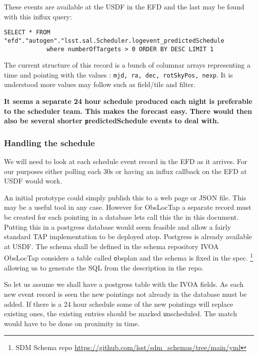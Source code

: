 These events are available at the USDF in the EFD and the last may be found with this influx query:
\begin{lstlisting}
SELECT * FROM "efd"."autogen"."lsst.sal.Scheduler.logevent_predictedSchedule
            where numberOfTargets > 0 ORDER BY DESC LIMIT 1
\end{lstlisting}

The current structure of this record is a bunch of columnar arrays representing a time and pointing with the
values : {\tt mjd, ra, dec, rotSkyPos, nexp}.
It is understood more values may follow such as field/tile and filter.


{\bf It seems a separate 24 hour schedule produced each night is preferable to the scheduler team. This makes the forecast easy. There would then also be several shorter {\texttt predictedSchedule} events to deal with. }

\subsubsection{Handling the schedule}
We will need to look at each schedule event record in the EFD as it arrives.
For our purposes either polling each 30s or having an influx callback on the EFD at USDF would
work.

An initial prototype could simply publish this to a web page or JSON file.
This may be a useful tool in any case.
However for ObsLocTap a separate record must be created for each pointing in a database lets call this the \DB in this document.
Putting this in a postgress database would seem feasible and allow a fairly standard TAP implementation to be deployed atop.
Postgress is already available at USDF.
The schema shall be  defined in the schema repository
IVOA ObsLocTap considers a table called {\texttt obsplan} and the schema is fixed in the spec.
\footnote{ SDM Schema repo \url{https://github.com/lsst/sdm_schemas/tree/main/yml}}
 allowing us to generate the SQL from the description in the repo.

So let us assume we shall have a postgress table with the IVOA fields.
As each new event record is seen the new pointings not already in the database must be added.
If there is a 24 hour schedule some of the new pointings will replace existing ones, the existing entries should be marked {\texttt unscheduled}.
The match would have to be done on proximity in time.

